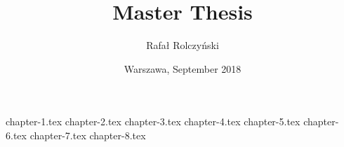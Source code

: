 \documentclass{report}
\title{ \textbf{Master Thesis} }
\author{Rafał Rolczyński}
\date{Warszawa, September 2018}
\renewcommand{\baselinestretch}{1.5}
\begin{document}


%
%

\renewcommand{\baselinestretch}{1.2}\normalsize
\tableofcontents
\renewcommand{\baselinestretch}{1.5}\normalsize

\printglossary[type=\acronymtype]
\printglossary

{chapter-1.tex}
{chapter-2.tex}
{chapter-3.tex}
{chapter-4.tex}
{chapter-5.tex}
{chapter-6.tex}
{chapter-7.tex}
{chapter-8.tex}

\listoftables
\listoffigures
\printbibliography
\end{document}
